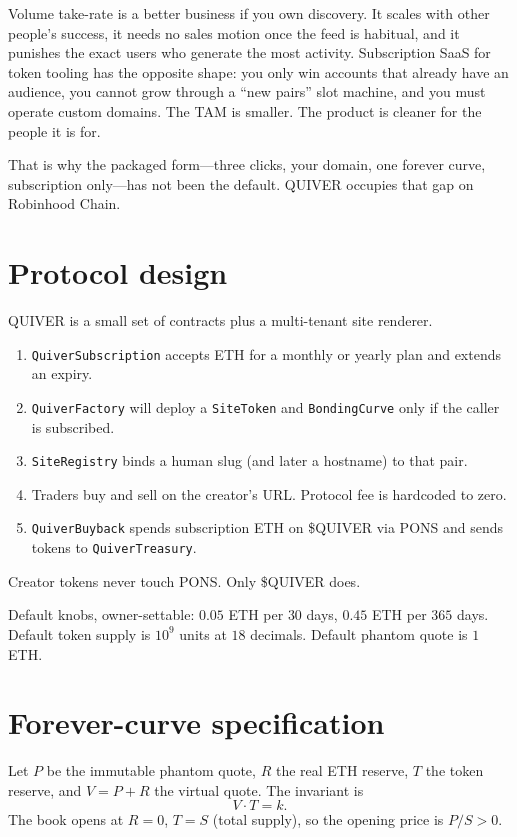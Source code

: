 \documentclass[11pt,a4paper]{article}
\begin{document}
Volume take-rate is a better business if you own discovery. It scales with other people's success, it needs no sales motion once the feed is habitual, and it punishes the exact users who generate the most activity. Subscription SaaS for token tooling has the opposite shape: you only win accounts that already have an audience, you cannot grow through a ``new pairs'' slot machine, and you must operate custom domains. The TAM is smaller. The product is cleaner for the people it is for.

That is why the packaged form---three clicks, your domain, one forever curve, subscription only---has not been the default. QUIVER occupies that gap on Robinhood Chain.

\section{Protocol design}

QUIVER is a small set of contracts plus a multi-tenant site renderer.

\begin{enumerate}[leftmargin=1.4em]
  \item \texttt{QuiverSubscription} accepts ETH for a monthly or yearly plan and extends an expiry.
  \item \texttt{QuiverFactory} will deploy a \texttt{SiteToken} and \texttt{BondingCurve} only if the caller is subscribed.
  \item \texttt{SiteRegistry} binds a human slug (and later a hostname) to that pair.
  \item Traders buy and sell on the creator's URL. Protocol fee is hardcoded to zero.
  \item \texttt{QuiverBuyback} spends subscription ETH on \$QUIVER via PONS and sends tokens to \texttt{QuiverTreasury}.
\end{enumerate}

Creator tokens never touch PONS. Only \$QUIVER does.

Default knobs, owner-settable: $0.05$ ETH per $30$ days, $0.45$ ETH per $365$ days. Default token supply is $10^9$ units at $18$ decimals. Default phantom quote is $1$ ETH.

\section{Forever-curve specification}

Let $P$ be the immutable phantom quote, $R$ the real ETH reserve, $T$ the token reserve, and $V = P + R$ the virtual quote. The invariant is
\begin{equation}
  V \cdot T = k.
\end{equation}
The book opens at $R = 0$, $T = S$ (total supply), so the opening price is $P/S > 0$.
\end{document}
